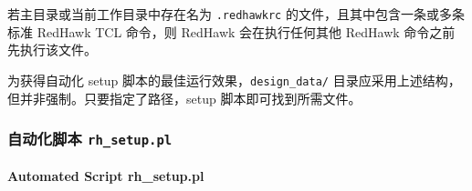 \begin{noteBox}
若主目录或当前工作目录中存在名为 \texttt{.redhawkrc} 的文件，且其中包含一条或多条标准 RedHawk TCL 命令，则 RedHawk 会在执行任何其他 RedHawk 命令之前先执行该文件。
\end{noteBox}

为获得自动化 setup 脚本的最佳运行效果，\texttt{design\_data/} 目录应采用上述结构，但并非强制。只要指定了路径，setup 脚本即可找到所需文件。

\subsubsection{自动化脚本 \texttt{rh\_setup.pl}}
\paragraph*{Automated Script rh\_setup.pl}

